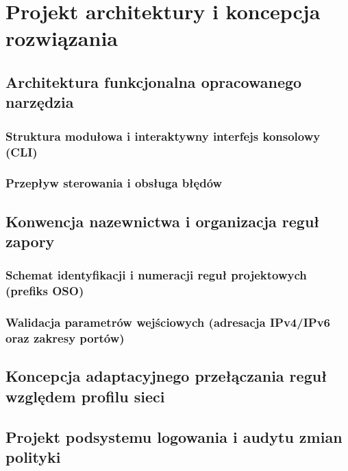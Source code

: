 \chapter{Projekt architektury i koncepcja rozwiązania}\label{ch:projekt-rozwiazania}

\section{Architektura funkcjonalna opracowanego narzędzia}\label{sec:architektura-narzedzia}

\subsection{Struktura modułowa i interaktywny interfejs konsolowy (CLI)}\label{subsec:struktura-modulowa-cli}

\subsection{Przepływ sterowania i obsługa błędów}\label{subsec:przeplyw-sterowania}

\section{Konwencja nazewnictwa i organizacja reguł zapory}\label{sec:konwencja-nazewnictwa}

\subsection{Schemat identyfikacji i numeracji reguł projektowych (prefiks OSO)}\label{subsec:schemat-prefiks-oso}

\subsection{Walidacja parametrów wejściowych (adresacja IPv4/IPv6 oraz zakresy portów)}\label{subsec:walidacja-parametrow}

\section{Koncepcja adaptacyjnego przełączania reguł względem profilu sieci}\label{sec:koncepcja-profili}

\section{Projekt podsystemu logowania i audytu zmian polityki}\label{sec:projekt-logowania}

